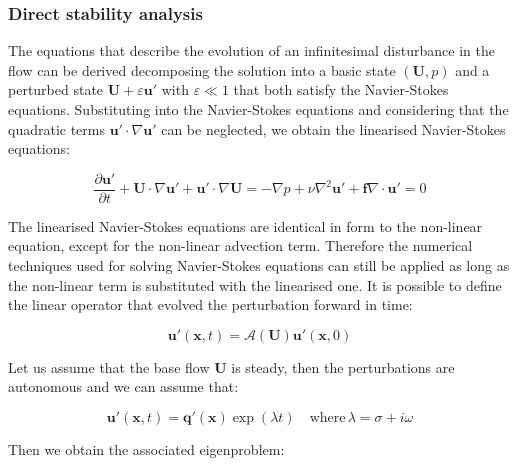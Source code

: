 \subsubsection{Direct stability analysis}


The equations that describe the evolution of an infinitesimal disturbance in the
flow can be derived decomposing the solution into a basic state $(\mathbf{U},
p)$ and a perturbed state  $\mathbf{U}+\varepsilon \mathbf{u'}$ with
$\varepsilon \ll 1$ that both satisfy the Navier-Stokes equations. Substituting
into the Navier-Stokes equations and considering that the quadratic terms $\mathbf{u'} \cdot \nabla \mathbf{u'}$ can be neglected, we obtain the linearised Navier-Stokes equations:

\begin{subequations}
\begin{equation}
  \frac{\partial \mathbf{u'}}{\partial t} + \mathbf{U} \cdot  \nabla \mathbf{u'}+\mathbf{u'} \cdot \nabla \mathbf{U} = -\nabla p + \nu \nabla^2 \mathbf{u'} + \mathbf{f}
\end{equation}

\begin{equation}
    \nabla \cdot \mathbf{u'} = 0
\end{equation}

\end{subequations}



The linearised Navier-Stokes equations are identical in form to the non-linear equation, except for the non-linear advection term. Therefore the numerical techniques used for solving Navier-Stokes equations can still be applied as long as the non-linear term is substituted with the linearised one. It is possible to define the linear operator that evolved the perturbation forward in time:

\begin{equation}
   \mathbf{u'}(\mathbf{x},t)=\mathcal{A}(\mathbf{U})\mathbf{u'}(\mathbf{x},0)
\end{equation}

Let us assume that the base flow  $\mathbf{U}$ is steady, then the perturbations are autonomous and we can assume that:

\begin{equation}
   \mathbf{u'}(\mathbf{x},t)=\mathbf{q'}(\mathbf{x})\exp(\lambda t) \quad \mbox{where} \, \lambda=\sigma+i \omega
\end{equation}

Then we obtain the associated eigenproblem:

